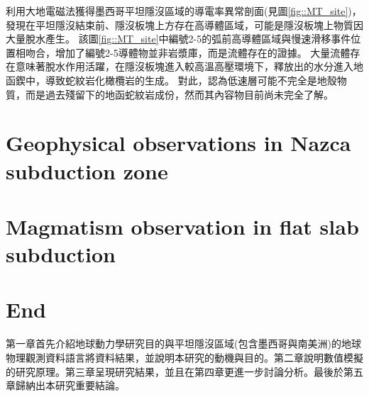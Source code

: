 \citealp{MT2006}利用大地電磁法獲得墨西哥平坦隱沒區域的導電率異常剖面(見圖\ref{fig::MT_site})，發現在平坦隱沒結束前、隱沒板塊上方存在高導體區域，可能是隱沒板塊上物質因大量脫水產生。
該圖\ref{fig::MT_site}中編號2-5的弧前高導體區域與慢速滑移事件位置相吻合，增加了編號2-5導體物並非岩漿庫，而是流體存在的證據。
大量流體存在意味著脫水作用活躍，在隱沒板塊進入較高溫高壓環境下，釋放出的水分進入地函鍥中，導致蛇紋岩化橄欖岩的生成。
對此，\citealp{Manea2013}認為低速層可能不完全是地殼物質，而是過去殘留下的地函蛇紋岩成份，然而其內容物目前尚未完全了解。

\section{Geophysical observations in Nazca subduction zone}

\section{Magmatism observation in flat slab subduction}

\section{End}
第一章首先介紹地球動力學研究目的與平坦隱沒區域(包含墨西哥與南美洲)的地球物理觀測資料語言將資料結果，並說明本研究的動機與目的。第二章說明數值模擬的研究原理。第三章呈現研究結果，並且在第四章更進一步討論分析。最後於第五章歸納出本研究重要結論。